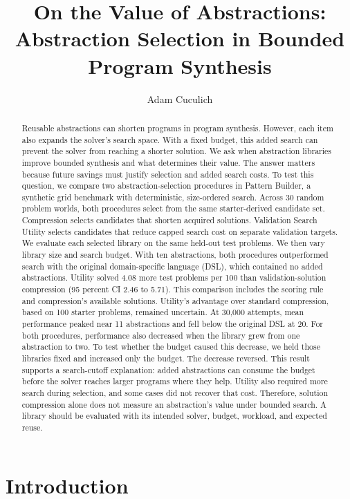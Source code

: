 \documentclass[10pt]{article}
\title{On the Value of Abstractions: Abstraction Selection in Bounded Program Synthesis}
\author{Adam Cuculich}
\begin{document}
\maketitle

\begin{abstract}
Reusable abstractions can shorten programs in program synthesis. However, each
item also expands the solver's search space. With a fixed budget, this added
search can prevent the solver from reaching a shorter solution. We ask when
abstraction libraries improve bounded synthesis and what determines their
value. The answer matters because future savings must justify selection and
added search costs.
To test this question, we compare two abstraction-selection procedures in
Pattern Builder, a synthetic grid benchmark with deterministic, size-ordered
search. Across 30 random problem worlds, both procedures select from the same
starter-derived candidate set. Compression selects candidates that shorten
acquired solutions. Validation Search Utility selects candidates that reduce
capped search cost on separate validation targets. We evaluate each selected
library on the same held-out test problems. We then vary library size and search
budget.
With ten abstractions, both procedures outperformed search with the original
domain-specific language (DSL), which contained no added abstractions. Utility
solved 4.08 more test problems per 100 than validation-solution compression (95
percent CI 2.46 to 5.71). This comparison includes the scoring rule and
compression's available solutions. Utility's advantage over standard
compression, based on 100 starter problems, remained uncertain. At 30,000
attempts, mean performance peaked near 11 abstractions and fell below the
original DSL at 20. For both procedures, performance also decreased when the
library grew from one abstraction to two. To test whether the budget caused
this decrease, we held those libraries fixed and increased only the budget. The
decrease reversed. This result supports a search-cutoff explanation: added
abstractions can consume the budget before the solver reaches larger programs
where they help. Utility also required more search during selection, and some
cases did not recover that cost. Therefore, solution compression alone does not
measure an abstraction's value under bounded search. A library should be
evaluated with its intended solver, budget, workload, and expected reuse.
\end{abstract}

\section{Introduction}
\end{document}
